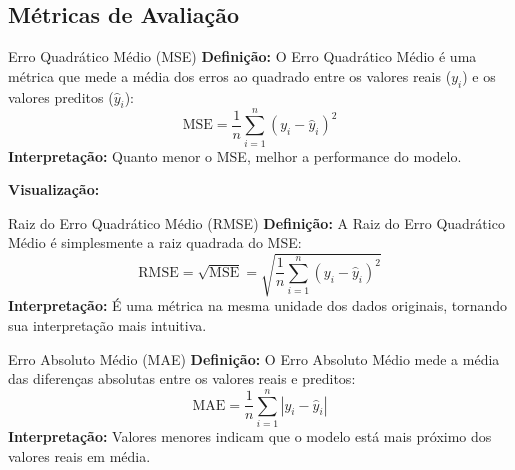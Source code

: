 \documentclass{beamer}
\begin{document}
\subsection{Métricas de Avaliação}

\begin{frame}{Erro Quadrático Médio (MSE)}
    \textbf{Definição:}
    O Erro Quadrático Médio é uma métrica que mede a média dos erros ao quadrado entre os valores reais ($y_i$) e os valores preditos ($\hat{y}_i$):
    \begin{equation}
        \text{MSE} = \frac{1}{n} \sum_{i=1}^{n} (y_i - \hat{y}_i)^2
    \end{equation}
    \textbf{Interpretação:} Quanto menor o MSE, melhor a performance do modelo.

    \vspace{0.3cm}
    \textbf{Visualização:}
\end{frame}


\begin{frame}{Raiz do Erro Quadrático Médio (RMSE)}
    \textbf{Definição:}
    A Raiz do Erro Quadrático Médio é simplesmente a raiz quadrada do MSE:
    \begin{equation}
        \text{RMSE} = \sqrt{\text{MSE}} = \sqrt{\frac{1}{n} \sum_{i=1}^{n} (y_i - \hat{y}_i)^2}
    \end{equation}
    \textbf{Interpretação:} É uma métrica na mesma unidade dos dados originais, tornando sua interpretação mais intuitiva.
\end{frame}

\begin{frame}{Erro Absoluto Médio (MAE)}
    \textbf{Definição:}
    O Erro Absoluto Médio mede a média das diferenças absolutas entre os valores reais e preditos:
    \begin{equation}
        \text{MAE} = \frac{1}{n} \sum_{i=1}^{n} |y_i - \hat{y}_i|
    \end{equation}
    \textbf{Interpretação:} Valores menores indicam que o modelo está mais próximo dos valores reais em média.
\end{frame}
\end{document}
